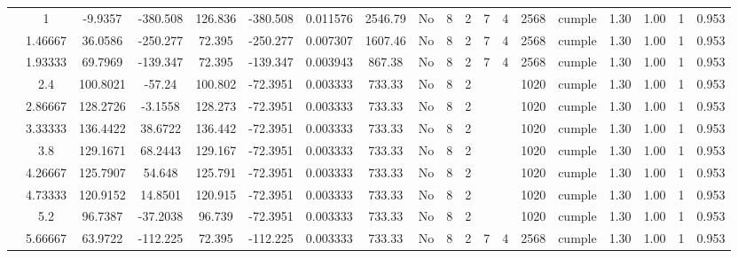 \begin{table}[H]
{\begin{tabular}{|c|c|c|c|c|c|r|c|c|c|c|c|c|c|c|c|c|c|c|}
\cline{2-19}        & \cellcolor[rgb]{ .851,  .882,  .949}1 & -9.9357 & -380.508 & 126.836 & -380.508 & 0.011576 & 2546.79 & No  & 8   & 2   & 7   & 4   & 2568 & \cellcolor[rgb]{ .776,  .937,  .808}cumple & 1.30 & 1.00 & 1   & 0.953 \bigstrut\\
\cline{2-19}        & 1.46667 & 36.0586 & -250.277 & 72.395 & -250.277 & 0.007307 & 1607.46 & No  & 8   & 2   & 7   & 4   & 2568 & \cellcolor[rgb]{ .776,  .937,  .808}cumple & 1.30 & 1.00 & 1   & 0.953 \bigstrut\\
\cline{2-19}        & 1.93333 & 69.7969 & -139.347 & 72.395 & -139.347 & 0.003943 & 867.38 & No  & 8   & 2   & 7   & 4   & 2568 & \cellcolor[rgb]{ .776,  .937,  .808}cumple & 1.30 & 1.00 & 1   & 0.953 \bigstrut\\
\cline{2-19}        & 2.4 & 100.8021 & -57.24 & 100.802 & -72.3951 & 0.003333 & 733.33 & No  & 8   & 2   &     &     & 1020 & \cellcolor[rgb]{ .776,  .937,  .808}cumple & 1.30 & 1.00 & 1   & 0.953 \bigstrut\\
\cline{2-19}        & 2.86667 & 128.2726 & -3.1558 & 128.273 & -72.3951 & 0.003333 & 733.33 & No  & 8   & 2   &     &     & 1020 & \cellcolor[rgb]{ .776,  .937,  .808}cumple & 1.30 & 1.00 & 1   & 0.953 \bigstrut\\
\cline{2-19}        & 3.33333 & 136.4422 & 38.6722 & 136.442 & -72.3951 & 0.003333 & 733.33 & No  & 8   & 2   &     &     & 1020 & \cellcolor[rgb]{ .776,  .937,  .808}cumple & 1.30 & 1.00 & 1   & 0.953 \bigstrut\\
\cline{2-19}        & 3.8 & 129.1671 & 68.2443 & 129.167 & -72.3951 & 0.003333 & 733.33 & No  & 8   & 2   &     &     & 1020 & \cellcolor[rgb]{ .776,  .937,  .808}cumple & 1.30 & 1.00 & 1   & 0.953 \bigstrut\\
\cline{2-19}        & 4.26667 & 125.7907 & 54.648 & 125.791 & -72.3951 & 0.003333 & 733.33 & No  & 8   & 2   &     &     & 1020 & \cellcolor[rgb]{ .776,  .937,  .808}cumple & 1.30 & 1.00 & 1   & 0.953 \bigstrut\\
\cline{2-19}        & 4.73333 & 120.9152 & 14.8501 & 120.915 & -72.3951 & 0.003333 & 733.33 & No  & 8   & 2   &     &     & 1020 & \cellcolor[rgb]{ .776,  .937,  .808}cumple & 1.30 & 1.00 & 1   & 0.953 \bigstrut\\
\cline{2-19}        & 5.2 & 96.7387 & -37.2038 & 96.739 & -72.3951 & 0.003333 & 733.33 & No  & 8   & 2   &     &     & 1020 & \cellcolor[rgb]{ .776,  .937,  .808}cumple & 1.30 & 1.00 & 1   & 0.953 \bigstrut\\
\cline{2-19}        & 5.66667 & 63.9722 & -112.225 & 72.395 & -112.225 & 0.003333 & 733.33 & No  & 8   & 2   & 7   & 4   & 2568 & \cellcolor[rgb]{ .776,  .937,  .808}cumple & 1.30 & 1.00 & 1   & 0.953 \bigstrut\\

\end{tabular}}
\end{table}
